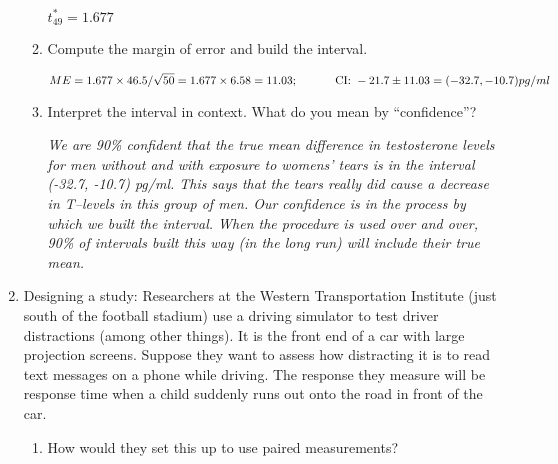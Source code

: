 \begin{enumerate}
\begin{enumerate}
\begin{key}
  {\it     $t^*_{49}  = 1.677 $ }
\end{key}
   \item  Compute the margin of error and build the interval.
\begin{students}
    \vspace{2cm}    
\end{students}

\begin{key}
$$ME = 1.677\times 46.5/\sqrt{50} = 1.677\times 6.58 = 11.03;
    \mbox{\hspace{.4in} CI: } -21.7 \pm 11.03 = (-32.7, -10.7) pg/ml$$
\end{key}

 \item Interpret the interval in context. What do you mean by ``confidence''?
\begin{students}
    \vspace{5cm}    
\end{students}

\begin{key}
  {\it  We are 90\% confident that the true mean difference in
    testosterone levels for men without and with exposure to womens'
    tears is in the interval (-32.7, -10.7) pg/ml. This says that the
    tears really did cause a decrease in T--levels in this group of
    men. Our confidence is in the process by which we built the
    interval.  When the procedure is used over and over, 90\% of
    intervals built this way (in the long run) will include their true
    mean.  }
\end{key}
          \end{enumerate}

   \item Designing a study: Researchers at the Western Transportation
     Institute (just south of the football stadium) use a driving
     simulator to test driver distractions (among other things). It is
     the front end of a car with large projection screens.  Suppose 
     they want to assess how distracting it is to read text messages
     on a phone while driving. The response they measure will be
     response time when a child suddenly runs out onto the road in
     front of the car.
     \begin{enumerate}
      \item How would they set this up to use  paired measurements?
\begin{students}
    \vspace{1cm}    
\end{students}


\end{enumerate}
\end{enumerate}
